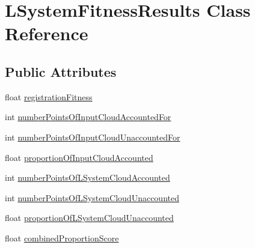 \hypertarget{classLSystemFitnessResults}{\section{L\-System\-Fitness\-Results Class Reference}
\label{classLSystemFitnessResults}
}
\subsection*{Public Attributes}
\begin{DoxyCompactItemize}
\item 
float \hyperlink{classLSystemFitnessResults_a8a504f7f78aa6021eb3572668eb5dfba}{registration\-Fitness}
\item 
int \hyperlink{classLSystemFitnessResults_a5cf08d744b4f638cee64d7aeb8821c9c}{number\-Points\-Of\-Input\-Cloud\-Accounted\-For}
\item 
int \hyperlink{classLSystemFitnessResults_ae8d95ced155f6ac36e4eb19725cfe441}{number\-Points\-Of\-Input\-Cloud\-Unaccounted\-For}
\item 
float \hyperlink{classLSystemFitnessResults_aabc87d6a999ae7fa104048005c8bb1db}{proportion\-Of\-Input\-Cloud\-Accounted}
\item 
int \hyperlink{classLSystemFitnessResults_a1b5d9c64670dc73b4b075af30e1583bc}{number\-Points\-Of\-L\-System\-Cloud\-Accounted}
\item 
int \hyperlink{classLSystemFitnessResults_a9050be03d7e06c7a3d47b054b2326a9f}{number\-Points\-Of\-L\-System\-Cloud\-Unaccounted}
\item 
float \hyperlink{classLSystemFitnessResults_a814c4e058e6a642f60bc675303f1b491}{proportion\-Of\-L\-System\-Cloud\-Unaccounted}
\item 
float \hyperlink{classLSystemFitnessResults_af87917318b623a6624c91fb5ef587578}{combined\-Proportion\-Score}
\end{DoxyCompactItemize}


